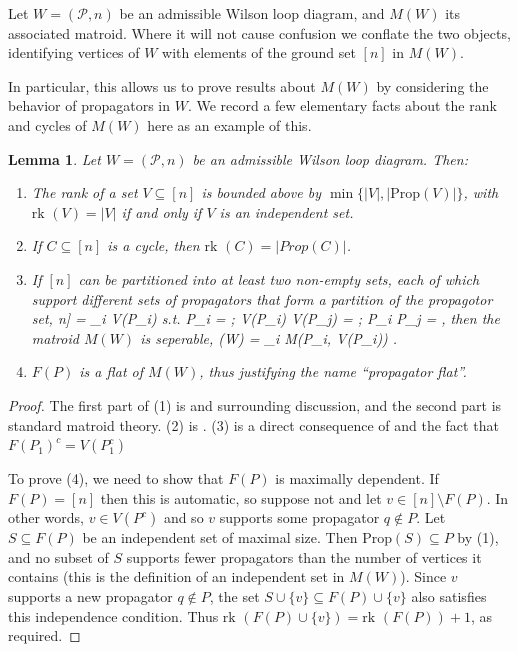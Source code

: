\documentclass[11pt]{article}
\newcommand{\rk}{\textrm{rk }}
\def\bas #1\eas{\begin{align*} #1 \end{align*}}
\newcommand{\cP}{\mathcal{P}}
\newcommand{\Prop}{\textrm{Prop}}
\newtheorem{lem}[thm]{Lemma}
\theoremstyle{remark}
\theoremstyle{definition}
\begin{document}
Let $W = (\cP,n)$ be an admissible Wilson loop diagram, and $M(W)$ its associated matroid. Where it will not cause confusion we conflate the two objects, identifying vertices of $W$ with elements of the ground set $[n]$ in $M(W)$. 

In particular, this allows us to prove results about $M(W)$ by considering the behavior of propagators in $W$. We record a few elementary facts about the rank and cycles of $M(W)$ here as an example of this.

\begin{lem}\label{lem facts about WLD matroids}
Let $W = (\cP,n)$ be an admissible Wilson loop diagram. Then:
\begin{enumerate}
\item The rank of a set $V \subseteq [n]$ is bounded above by $\min\{|V|,|\Prop(V)|\}$, with $\rk(V) = |V|$ if and only if $V$ is an independent set.
\item If $C \subseteq [n]$ is a cycle, then $\rk(C) = |Prop(C)|$.
\item If $[n]$ can be partitioned into at least two non-empty sets, each of which support different sets of propagators that form a partition of the propagotor set, \bas [n] = \sqcup_i V(P_i) \quad \textrm{s.t.} \quad \sqcup P_i = \cP; \quad V(P_i) \cap V(P_j) = \emptyset; \quad  P_i \cap P_j = \emptyset \;, \eas then the matroid $M(W)$ is seperable, \bas M(W) = \bigoplus_i M(P_i, V(P_i)) \;.\eas 
\item $F(P)$ is a flat of $M(W)$, thus justifying the name ``propagator flat''.
\end{enumerate}
\end{lem}
\begin{proof}
The first part of (1) is \cite[Equation (9)]{wilsonloop} and surrounding discussion, and the second part is standard matroid theory. (2) is \cite[Lemma 3.27]{wilsonloop}. (3) is a direct consequence of \cite[Lemma 3.20]{wilsonloop} and the fact that $F(P_1)^c = V(P_1^c)$

To prove (4), we need to show that $F(P)$ is maximally dependent. If $F(P) = [n]$ then this is automatic, so suppose not and let $v \in [n] \setminus F(P)$. In other words, $v \in V(P^c)$ and so $v$ supports some propagator $q \not\in P$.  Let $S \subseteq F(P)$ be an independent set of maximal size. Then $\Prop(S) \subseteq P$ by (1), and no subset of $S$ supports fewer propagators than the number of vertices it contains (this is the definition of an independent set in $M(W)$). Since $v$ supports a new propagator $q \not\in P$, the set $S \cup \{v\} \subseteq F(P) \cup\{v\}$ also satisfies this independence condition. Thus $\rk(F(P) \cup\{v\}) = \rk(F(P)) + 1$, as required.
\end{proof}
\end{document}
